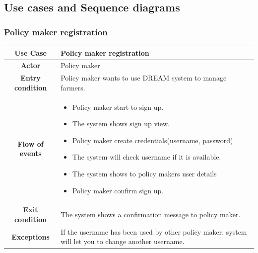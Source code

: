 \documentclass[../../main.tex]{subfiles}
\begin{document}
\subsection{Use cases and Sequence diagrams}
      \subsubsection{Policy maker registration}
      \begin{table}[H]
        \centering
          \begin{tabular}{c m{}}
          \hline
          \textbf{Use Case} & Policy maker registration\\ \hline
          \textbf{Actor} & Policy maker\\ \hline
          \textbf{Entry condition} & Policy maker wants to use DREAM system to manage farmers.\\  \hline
          \textbf{Flow of events} & \begin{itemize}
                                      \item Policy maker start to sign up.
                                      \item The system shows sign up view.
                                      \item Policy maker create credentials(username, password)
                                      \item The system will check username if it is available.
                                      \item The system shows to policy makers user details
                                      \item Policy maker confirm sign up.
                
                                    \end{itemize}\\ \hline
          \textbf{Exit condition} & The system shows a confirmation message to policy maker. \\ \hline
          \textbf{Exceptions} &  If the username has been used by other policy maker, system will let you to change another username.\\ 
          \hline
          \end{tabular}
      \end{table}
\end{document}

